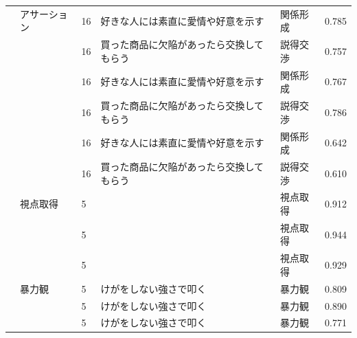 \begin{landscape}
\begin{longtable}{p{2cm}p{2cm}p{2cm}p{6cm}p{2cm}p{2cm}}
        \citet{Akazawa202192}    & アサーション                           & 16  & 好きな人には素直に愛情や好意を示す                                   & 関係形成                 & 0.785   \\
                                 &                                  & 16  & 買った商品に欠陥があったら交換してもらう                                & 説得交渉                 & 0.757   \\
                                 &                                  & 16  & 好きな人には素直に愛情や好意を示す                                   & 関係形成                 & 0.767   \\
                                 &                                  & 16  & 買った商品に欠陥があったら交換してもらう                                & 説得交渉                 & 0.786   \\
                                 &                                  & 16  & 好きな人には素直に愛情や好意を示す                                   & 関係形成                 & 0.642   \\
                                 &                                  & 16  & 買った商品に欠陥があったら交換してもらう                                & 説得交渉                 & 0.610   \\
                                 & 視点取得                             & 5   &                                                     & 視点取得                 & 0.912   \\
                                 &                                  & 5   &                                                     & 視点取得                 & 0.944   \\
                                 &                                  & 5   &                                                     & 視点取得                 & 0.929   \\
                                 & 暴力観                              & 5   & けがをしない強さで叩く                                         & 暴力観                  & 0.809   \\
                                 &                                  & 5   & けがをしない強さで叩く                                         & 暴力観                  & 0.890   \\
                                 &                                  & 5   & けがをしない強さで叩く                                         & 暴力観                  & 0.771   \\

\end{longtable}
\end{landscape}
